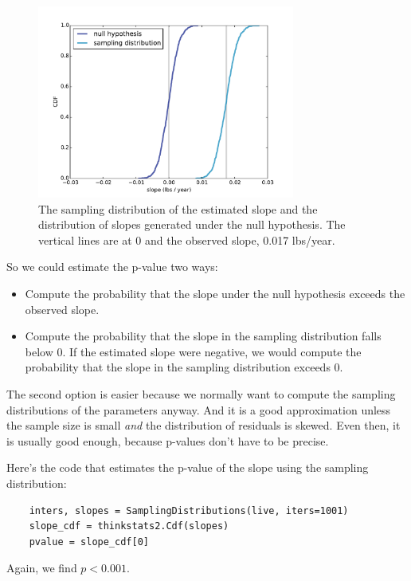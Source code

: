 \documentclass[12pt]{book}
\begin{document}
\begin{figure}
\centerline{\includegraphics[height=2.5in]{figs/linear4.pdf}}
\caption{The sampling distribution of the estimated
slope and the distribution of slopes
generated under the null hypothesis.  The vertical lines are at 0
and the observed slope, 0.017 lbs/year.}
\label{linear4}
\end{figure}

So we could estimate the p-value two ways:

\begin{itemize}

\item Compute the probability that the slope under the null
hypothesis exceeds the observed slope.

\item Compute the probability that the slope in the sampling
distribution falls below 0.  If the estimated slope were negative,
we would compute the probability that the slope in the sampling
distribution exceeds 0.

\end{itemize}

The second option is easier because we normally want to compute the
sampling distributions of the parameters anyway.  And it is a good
approximation unless the sample size is small {\em and} the
distribution of residuals is skewed.  Even then, it is usually good
enough, because p-values don't have to be precise.

Here's the code that estimates the p-value of the slope using the
sampling distribution:

\begin{verbatim}
    inters, slopes = SamplingDistributions(live, iters=1001)
    slope_cdf = thinkstats2.Cdf(slopes)
    pvalue = slope_cdf[0]
\end{verbatim}

Again, we find $p < 0.001$.  
\end{document}

